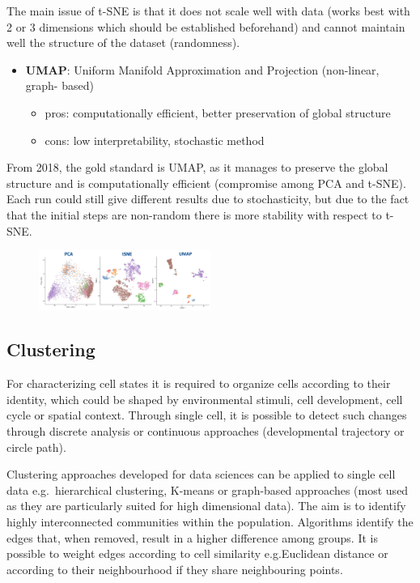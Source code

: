 The main issue of t-SNE is that it does not scale well with data (works
best with 2 or 3 dimensions which should be established beforehand) and
cannot maintain well the structure of the dataset (randomness).

\begin{itemize}
\tightlist
\item
  \textbf{UMAP}: Uniform Manifold Approximation and Projection
  (non-linear, graph- based)

  \begin{itemize}
  \tightlist
  \item
    pros: computationally efficient, better preservation of global
    structure
  \item
    cons: low interpretability, stochastic method
  \end{itemize}
\end{itemize}

From 2018, the gold standard is UMAP, as it manages to preserve the
global structure and is computationally efficient (compromise among PCA
and t-SNE). Each run could still give different results due to
stochasticity, but due to the fact that the initial steps are non-random
there is more stability with respect to t-SNE.

\begin{figure}
\centering
\includegraphics[width=0.5\textwidth]{images/Screen_Shot_2023-02-22_at_15-18-21.png}
\caption{}
\end{figure}

\hypertarget{clustering}{%
\subsection{Clustering}\label{clustering}}

For characterizing cell states it is required to organize cells
according to their identity, which could be shaped by environmental
stimuli, cell development, cell cycle or spatial context. Through single
cell, it is possible to detect such changes through discrete analysis or
continuous approaches (developmental trajectory or circle path).

Clustering approaches developed for data sciences can be applied to
single cell data e.g.~hierarchical clustering, K-means or graph-based
approaches (most used as they are particularly suited for high
dimensional data). The aim is to identify highly interconnected
communities within the population. Algorithms identify the edges that,
when removed, result in a higher difference among groups. It is possible
to weight edges according to cell similarity e.g.Euclidean distance or
according to their neighbourhood if they share neighbouring points.

